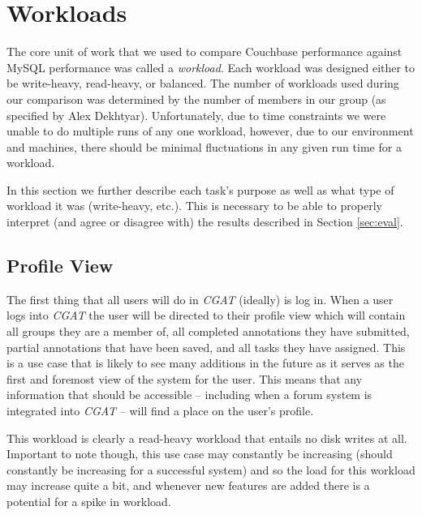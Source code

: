 \documentclass[10pt, conference, compsocconf]{IEEEtran}
\begin{document}
\section{Workloads}\label{sec:workload}
The core unit of work that we used to compare Couchbase performance against
MySQL performance was called a \textit{workload}. Each workload was designed
either to be write-heavy, read-heavy, or balanced. The number of workloads used
during our comparison was determined by the number of members in our group (as
specified by Alex Dekhtyar). Unfortunately, due to time constraints we were
unable to do multiple runs of any one workload, however, due to our environment
and machines, there should be minimal fluctuations in any given run time for a
workload.

In this section we further describe each task's purpose as well as what type of
workload it was (write-heavy, etc.). This is necessary to be able to properly
interpret (and agree or disagree with) the results described in Section
\ref{sec:eval}.

\subsection{Profile View}
The first thing that all users will do in \textit{CGAT} (ideally) is log in.
When a user logs into \textit{CGAT} the user will be directed to their profile
view which will contain all groups they are a member of, all completed
annotations they have submitted, partial annotations that have been saved, and
all tasks they have assigned. This is a use case that is likely to see many
additions in the future as it serves as the first and foremost view of the
system for the user. This means that any information that should be accessible
-- including when a forum system is integrated into \textit{CGAT} -- will find
a place on the user's profile.

This workload is clearly a read-heavy workload that entails no disk writes at
all. Important to note though, this use case may constantly be increasing
(should constantly be increasing for a successful system) and so the load for
this workload may increase quite a bit, and whenever new features are added
there is a potential for a spike in workload.
\end{document}
